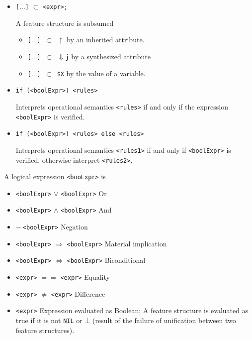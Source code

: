 \documentclass[11pt]{article}
\begin{document}
\begin{itemize}
\begin{itemize}
    \item  \verb#[#$\dots$\verb#]# $\subset$ \verb#<expr>;#

      A feature structure is subsumed

      \begin{itemize}
      \item \verb#[#$\dots$\verb#] #$\subset$\verb# #$\uparrow$ by an inherited attribute.
      \item \verb#[#$\dots$\verb#] #$\subset$\verb# #$\Downarrow$\verb#j# by a synthesized attribute
      \item \verb#[#$\dots$\verb#] #$\subset$\verb# $X# by the value of a variable.
      \end{itemize}
      
    \item \verb#if (<boolExpr>) <rules>#
    
      Interprets operational semantics \verb#<rules># if and only
      if the expression \verb#<boolExpr># is verified.

    \item \verb#if (<boolExpr>) <rules> else <rules>#
      
      Interprets operational semantics \verb#<rules1># if and
      only if \verb#<boolExpr># is verified, otherwise interpret \verb#<rules2>#.
      
    \end{itemize}

    A logical expression \verb#<booExpr># is

    \begin{itemize}
    \item \verb#<boolExpr>#  $\lor$ \verb#<boolExpr># Or
    \item \verb#<boolExpr>#  $\land$ \verb#<boolExpr># And
    \item $\neg$ \verb#<boolExpr># Negation
    \item \verb#<boolExpr>#  $\Rightarrow$ \verb#<boolExpr>#
      Material implication
    \item \verb#<boolExpr>#  $\Leftrightarrow$ \verb#<boolExpr>#
      Biconditional
    \item \verb#<expr>#  $==$ \verb#<expr># Equality
    \item \verb#<expr>#  $\neq$ \verb#<expr># Difference
    \item \verb#<expr># Expression evaluated as Boolean: A
      feature structure is evaluated as true if it is not
      \verb#NIL# or $\bot$ (result of the failure of unification
      between two feature structures).
    \end{itemize}
    

\end{itemize}
\end{document}
